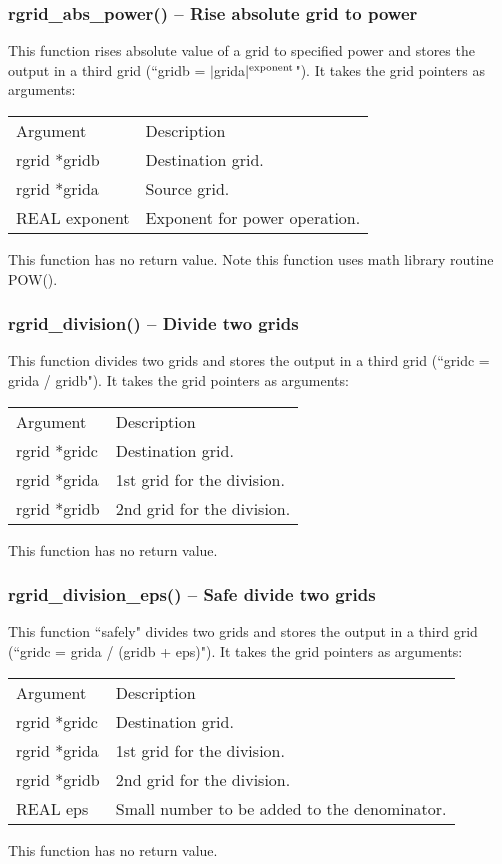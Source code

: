 \documentclass[12pt,letterpaper]{article}
\begin{document}
\subsubsection{rgrid\_abs\_power() -- Rise absolute grid to power}

This function rises absolute value of a grid to specified power and stores the output in a third grid (``gridb = $|$grida$|^\textnormal{exponent}$"). It takes the grid pointers as arguments:
\begin{longtable}{p{} p{}}
Argument & Description\\
\cline{1-2}
rgrid *gridb & Destination grid.\\
rgrid *grida & Source grid.\\
REAL exponent & Exponent for power operation.\\
\end{longtable}
\noindent
This function has no return value. Note this function uses math library routine POW().

\subsubsection{rgrid\_division() -- Divide two grids}

This function divides two grids and stores the output in a third grid (``gridc = grida / gridb"). It takes the grid pointers as arguments:
\begin{longtable}{p{} p{}}
Argument & Description\\
\cline{1-2}
rgrid *gridc & Destination grid.\\
rgrid *grida & 1st grid for the division.\\
rgrid *gridb & 2nd grid for the division.\\
\end{longtable}
\noindent
This function has no return value.

\subsubsection{rgrid\_division\_eps() -- Safe divide two grids}

This function ``safely" divides two grids and stores the output in a third grid (``gridc = grida / (gridb + eps)"). It takes the grid pointers as arguments:
\begin{longtable}{p{} p{}}
Argument & Description\\
\cline{1-2}
rgrid *gridc & Destination grid.\\
rgrid *grida & 1st grid for the division.\\
rgrid *gridb & 2nd grid for the division.\\
REAL eps & Small number to be added to the denominator.\\
\end{longtable}
\noindent
This function has no return value.
\end{document}
